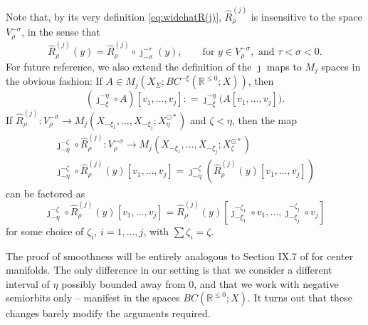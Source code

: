 \documentclass[a4paper, 12pt, oneside, reqno, notitlepage]{amsart}
\theoremstyle{plain}
\theoremstyle{definition}
\theoremstyle{remark}
\begin{document}
Note that, by its very definition \eqref{eq:widehatR(j)}, $\widehat{R}_\rho^{(j)}$ is insensitive to the space $V^{-\sigma}_\rho$, in the sense that
\begin{equation}
    \widehat{R}_\rho^{(j)} (y)= \widehat{R}_\rho^{(j)} \circ \jmath_{-\sigma}^{-\tau} (y), \qquad \text{for } y \in  V^{-\sigma}_\rho, \text{ and } \tau<\sigma<0.
    \label{eq:domain_Rhat}
\end{equation}
For future reference, we also extend the definition of the $\jmath$ maps to $M_j$ spaces in the obvious fashion:
If $A \in M_j(X_\Sigma; BC^{-\xi}(\mathbb{R}^{\leq 0};X))$, then
\begin{equation}
    (\jmath_{-\xi}^{-\eta} \circ A)[v_1,\ldots,v_j] : = \jmath_{-\xi}^{-\eta} \big( A  [v_1,\ldots,v_j]\big).
    \label{eq:jmathMj}
\end{equation}
If $\widehat{R}_\rho^{(j)} : V_\rho^{-\sigma} \to M_j(X_{-\xi_1},\ldots,X_{-\xi_j};X^{\odot *}_{\eta})$
and $\zeta < \eta$, then the map
\begin{gather*}
    \jmath_{-\eta}^{-\zeta} \circ \widehat{R}_\rho^{(j)} : V_\rho^{-\sigma} \to M_j(X_{-\xi_1},\ldots,X_{-\xi_j};X^{\odot *}_{\zeta}) \\ 
    \jmath_{-\eta}^{-\zeta} \circ \widehat{R}_\rho^{(j)} (y)[v_1,\ldots,v_j] = \jmath_{-\eta}^{-\zeta} \left( \widehat{R}_\rho^{(j)} (y)[v_1,\ldots,v_j] \right) 
\end{gather*}
can be factored as
\begin{equation}
    \jmath_{-\eta}^{-\zeta} \circ \widehat{R}_\rho^{(j)} (y)[v_1,\ldots,v_j] = \widehat{R}_\rho^{(j)}(y)[ \jmath_{-\xi_1}^{-\zeta_1} \circ v_1,\ldots,  \jmath_{-\xi_j}^{-\zeta_j} \circ v_j]
    \label{eq:factorjmathRhat}
\end{equation}
for some choice of $\zeta_i$, $i = 1,\ldots,j$, with $\sum\zeta_i = \zeta$.









The proof of smoothness will be entirely analogous to Section IX.7 of \cite{diekmann2012delay} for center manifolds. The only difference in our setting is that we consider a different interval of $\eta$ possibly bounded away from $0$, and that we work with negative semiorbits only -- manifest in the spaces $BC(\mathbb{R}^{\leq 0};X)$.
It turns out that these changes barely modify the arguments required.
\end{document}
